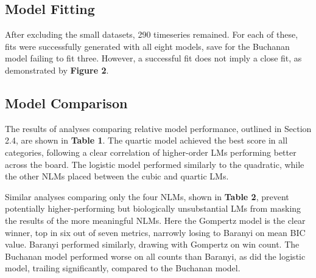 \documentclass[11pt]{article}
\begin{document}
\subsection{Model Fitting}

After excluding the small datasets, 290 timeseries remained. For each of these, fits were successfully generated with all eight models, save for the Buchanan model failing to fit three. However, a successful fit does not imply a close fit, as demonstrated by \textbf{Figure 2}. 




\subsection{Model Comparison}

The results of analyses comparing relative model performance, outlined in Section 2.4, are shown in \textbf{Table 1}. The quartic model achieved the best score in all categories, following a clear correlation of higher-order LMs performing better across the board. The logistic model performed similarly to the quadratic, while the other NLMs placed between the cubic and quartic LMs. 

Similar analyses comparing only the four NLMs, shown in \textbf{Table 2}, prevent potentially higher-performing but biologically unsubstantial LMs from masking the results of the more meaningful NLMs. Here the Gompertz model is the clear winner, top in six out of seven metrics, narrowly losing to Baranyi on mean BIC value. Baranyi performed similarly, drawing with Gompertz on win count. The Buchanan model performed worse on all counts than Baranyi, as did the logistic model, trailing significantly, compared to the Buchanan model. 
\end{document}

